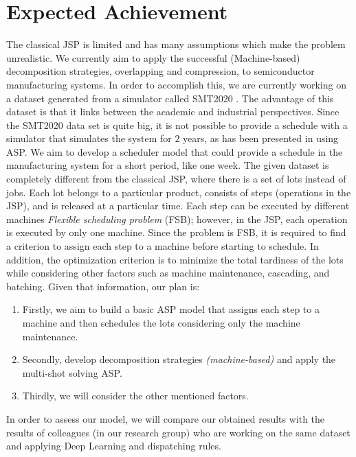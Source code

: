 \documentclass[submission,copyright,creativecommons]{eptcs}
\begin{document}
\section{Expected Achievement}
The classical JSP is limited and has many assumptions which make the problem unrealistic. We currently aim to apply the successful (Machine-based) decomposition strategies, overlapping and compression, to semiconductor manufacturing systems. In order to accomplish this, we are currently working on a dataset generated from a simulator called SMT2020 \cite{kopp2020smt2020}. The advantage of this dataset is that it links between the academic and industrial perspectives. Since the SMT2020 data set is quite big, it is not possible to provide a schedule with a simulator that simulates the system for $2$ years, as has been presented in \cite{kopp2020smt2020} using ASP. We aim to develop a scheduler model that could provide a schedule in the manufacturing system for a short period, like one week. The given dataset is completely different from the classical JSP, where there is a set of lots instead of jobs. Each lot belongs to a particular product, consists of steps (operations in the JSP), and is released at a particular time. Each step can be executed by different machines \textit{Flexible scheduling problem} (FSB); however, in the JSP, each operation is executed by only one machine. Since the problem is FSB, it is required to find a criterion to assign each step to a machine before starting to schedule. In addition, the optimization criterion is to minimize the total tardiness of the lots while considering other factors such as machine maintenance, cascading, and batching. Given that information, our plan is:
\begin{enumerate}
  \item Firstly, we aim to build a basic ASP model that assigns each step to a machine and then schedules the lots considering only the machine maintenance.
  \item Secondly, develop decomposition strategies \textit{(machine-based)} and apply the multi-shot solving ASP.
  \item Thirdly, we will consider the other mentioned factors.
\end{enumerate}

In order to assess our model, we will compare our obtained results with the results of colleagues (in our research group) who are working on the same dataset and applying Deep Learning and dispatching rules.

\nocite{*}


\end{document}
